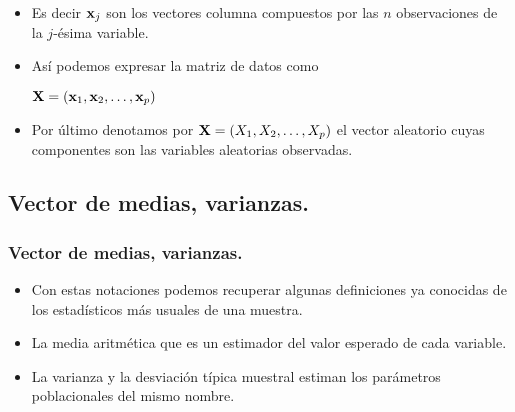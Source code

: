\begin{frame}
\begin{itemize}
\item Es decir $\mathbf{x}_j$ son los vectores columna compuestos por las $n$ observaciones de la  $j$-ésima variable.

\item  Así podemos expresar la matriz de datos como
 
 $\mathbf{X}=(\mathbf{x}_1,\mathbf{x}_2,\ldots,\mathbf{x}_p)$
 
\item Por último denotamos por $\mathbf{X}=(X_1,X_2,\ldots, X_p)$ el vector aleatorio cuyas componentes son las variables aleatorias observadas.
\end{itemize}
\end{frame}

\subsection{Vector de medias, varianzas.}


\begin{frame}
\frametitle{Vector de medias, varianzas.}
\begin{itemize}
\item Con estas notaciones  podemos recuperar algunas definiciones ya conocidas de los estadísticos más usuales de una muestra.
\item La media aritmética que es un estimador del valor esperado de cada variable.
\item La varianza y la desviación típica muestral estiman los parámetros poblacionales del mismo nombre.
\end{itemize}
\end{frame}


